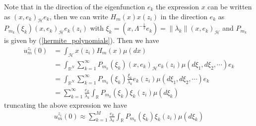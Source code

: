 	\noindent Note that in the direction of the eigenfunction $e_k$ the expression $x$ can be written as $(x, e_k )_{\mathcal{H}} e_k$, then we can write $H_m (x) x (z_i)$ in the direction $e_k$ as $P_{m_k} (\xi_k) (x, e_k )_{\mathcal{H}} e_k (z_i)$ with $\xi_k = (x, \Lambda^{-\frac{1}{2}} e_k) = \| \lambda_k \| (x, e_k )_{\mathcal{H}}$ and $P_{m_k}$ is given by (\ref{hermite_polynomials}). Then we have
	\begin{align*}
		u^{z_i}_m (0) &= \displaystyle \int_{\mathcal{H}} x(z_i) H_m (x) \mu (dx) \\
		&= \int_{\mathbb{R}^N} \sum_{k=1}^{\infty} P_{m_k} (\xi_k) (x, e_k )_{\mathcal{H}} e_k (z_i) \mu (d\xi_1, d\xi_2, \cdots) e_k \\
		&= \int_{\mathbb{R}^N} \sum_{k=1}^{\infty} P_{m_k} (\xi_k) \frac{\xi_k}{\lambda_k} e_k (z_i) \mu (d\xi_1, d\xi_2, \cdots) e_k \\
		&= \sum_{k=1}^{\infty} \frac{e_k}{\lambda_k} \int_{\mathbb{R}}  P_{m_k} (\xi_k) \xi_k (z_i) \mu (d\xi_k)
	\end{align*}
	truncating the above expression we have
	\begin{align}
		\label{IC_approx}
		u^{z_i}_m (0) \approx \displaystyle \sum_{k=1}^{M} \frac{e_k}{\lambda_k} \int_{\mathbb{R}}  P_{m_k} (\xi_k) \xi_k (z_i) \mu (d\xi_k)
	\end{align} 
	
